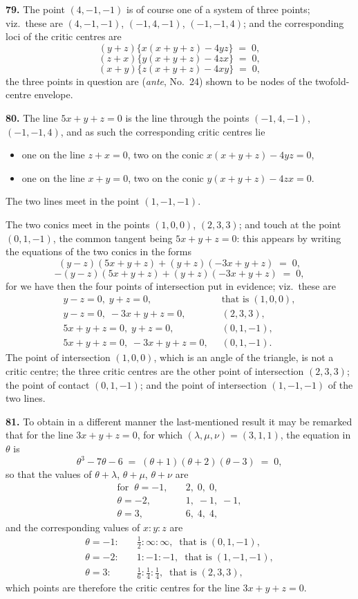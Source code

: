 \documentclass[11pt,a4paper]{article}
\begin{document}
\textbf{79.} The point $(4,-1,-1)$ is of course one of a system of three points; viz.\ these are $(4,-1,-1)$, $(-1,4,-1)$, $(-1,-1,4)$; and the corresponding loci of the critic centres are
\[
(y+z)\bigl\{x(x+y+z)-4yz\bigr\} \;=\; 0,
\]
\[
(z+x)\bigl\{y(x+y+z)-4zx\bigr\} \;=\; 0,
\]
\[
(x+y)\bigl\{z(x+y+z)-4xy\bigr\} \;=\; 0,
\]
the three points in question are (\emph{ante}, No.~24) shown to be nodes of the twofold-centre envelope.

\medskip

\textbf{80.} The line $5x + y + z = 0$ is the line through the points $(-1,4,-1)$, $(-1,-1,4)$, and as such the corresponding critic centres lie
\begin{itemize}\itemsep0pt
\item one on the line $z+x=0$, two on the conic $x(x+y+z)-4yz=0$,
\item one on the line $x+y=0$, two on the conic $y(x+y+z)-4zx=0$.
\end{itemize}
The two lines meet in the point $(1,-1,-1)$.

The two conics meet in the points $(1,0,0)$, $(2,3,3)$; and touch at the point $(0,1,-1)$, the common tangent being $5x + y + z = 0$: this appears by writing the equations of the two conics in the forms
\[
(y-z)(5x+y+z) + (y+z)(-3x+y+z) \;=\; 0,
\]
\[
-(y-z)(5x+y+z) + (y+z)(-3x+y+z) \;=\; 0,
\]
for we have then the four points of intersection put in evidence; viz.\ these are
\begin{align*}
y-z=0,\; y+z=0,\;\;&\text{that is}\;(1,0,0),\\
y-z=0,\; -3x+y+z=0,\;\;&(2,3,3),\\
5x+y+z=0,\; y+z=0,\;\;&(0,1,-1),\\
5x+y+z=0,\; -3x+y+z=0,\;\;&(0,1,-1).
\end{align*}
The point of intersection $(1,0,0)$, which is an angle of the triangle, is not a critic centre; the three critic centres are the other point of intersection $(2,3,3)$; the point of contact $(0,1,-1)$; and the point of intersection $(1,-1,-1)$ of the two lines.

\medskip

\textbf{81.} To obtain in a different manner the last-mentioned result it may be remarked that for the line $3x + y + z = 0$, for which $(\lambda,\mu,\nu) = (3,1,1)$, the equation in $\theta$ is
\[
\theta^{3}-7\theta-6 \;=\; (\theta+1)(\theta+2)(\theta-3) \;=\; 0,
\]
so that the values of $\theta + \lambda$, $\theta + \mu$, $\theta + \nu$ are
\begin{align*}
\text{for}\;\;\theta=-1,&\quad 2,\;0,\;0,\\
\theta=-2,&\quad 1,\;-1,\;-1,\\
\theta=3,&\quad 6,\;4,\;4,
\end{align*}
and the corresponding values of $x:y:z$ are
\begin{align*}
\theta=-1:&\quad\tfrac{1}{2}:\infty:\infty,\;\;\text{that is}\;(0,1,-1),\\
\theta=-2:&\quad 1:-1:-1,\;\;\text{that is}\;(1,-1,-1),\\
\theta=3:&\quad\tfrac{1}{6}:\tfrac{1}{4}:\tfrac{1}{4},\;\;\text{that is}\;(2,3,3),
\end{align*}
which points are therefore the critic centres for the line $3x+y+z=0$.
\end{document}
